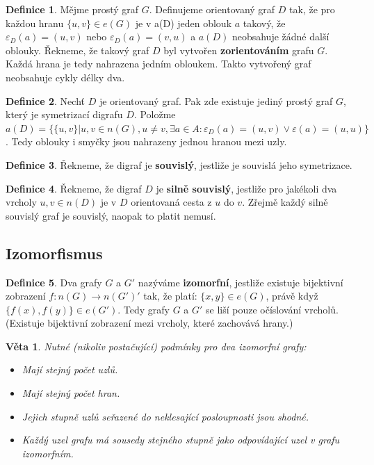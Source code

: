\documentclass[a4]{report}
\newtheorem{theorem}{Věta}
\theoremstyle{definition}
\newtheorem{definition}{Definice}[section]
\begin{document}
\begin{definition}
Mějme prostý graf $G$. Definujeme orientovaný graf $D$ tak, že pro každou hranu $\{ u, v \} \in e(G)$ je v a(D) jeden oblouk $a$ takový, že $\varepsilon_D (a) = (u, v)$ nebo $\varepsilon_D (a) = (v,u)$ a $a(D)$ neobsahuje žádné další oblouky. Řekneme, že takový graf $D$ byl vytvořen \textbf{zorientováním} grafu $G$. Každá hrana je tedy nahrazena jedním obloukem. Takto vytvořený graf neobsahuje cykly délky dva.
\end{definition}

\begin{definition}
Nechť $D$ je orientovaný graf. Pak zde existuje jediný prostý graf $G$, který je symetrizací digrafu $D$. Položme $a(D) = \{ \{ u, v \} | u, v \in n(G), u \neq v, \exists a \in A : \varepsilon_D (a) = (u,v) \vee \varepsilon (a) = (u, u) \}$. Tedy oblouky i smyčky jsou nahrazeny jednou hranou mezi uzly.
\end{definition}

\begin{definition}
Řekneme, že digraf je \textbf{souvislý}, jestliže je souvislá jeho symetrizace.
\end{definition}

\begin{definition}
Řekneme, že digraf $D$ je \textbf{silně souvislý}, jestliže pro jakékoli dva vrcholy $u, v \in n(D)$ je v $D$ orientovaná cesta z $u$ do $v$. Zřejmě každý silně souvislý graf je souvislý, naopak to platit nemusí.
\end{definition}

\subsection{Izomorfismus}

\begin{definition}
Dva grafy $G$ a $G'$ nazýváme \textbf{izomorfní}, jestliže existuje bijektivní zobrazení $f: n(G) \rightarrow n(G')'$ tak, že platí:
$\{ x, y \} \in e(G)$, právě když $\{f(x), f(y) \} \in e(G')$. Tedy grafy $G$ a $G'$ se liší pouze očíslování vrcholů. (Existuje bijektivní zobrazení mezi vrcholy, které zachovává hrany.)
\end{definition}

\begin{theorem}
Nutné (nikoliv postačující) podmínky pro dva izomorfní grafy:
\begin{itemize}
    \item Mají stejný počet uzlů.
    \item Mají stejný počet hran.
    \item Jejich stupně uzlů seřazené do neklesající posloupnosti jsou shodné.
    \item Každý uzel grafu má sousedy stejného stupně jako odpovídající uzel v grafu izomorfním.
\end{itemize}
\end{theorem}
\end{document}
